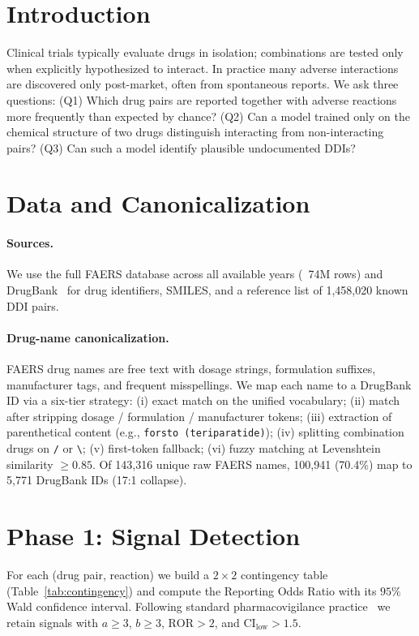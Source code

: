 \documentclass{article}
\begin{document}
\section{Introduction}\label{sec:intro}
Clinical trials typically evaluate drugs in isolation; combinations are tested only when explicitly hypothesized to interact. In practice many adverse interactions are discovered only post-market, often from spontaneous reports. We ask three questions: (Q1) Which drug pairs are reported together with adverse reactions more frequently than expected by chance? (Q2) Can a model trained only on the chemical structure of two drugs distinguish interacting from non-interacting pairs? (Q3) Can such a model identify plausible undocumented DDIs?

\section{Data and Canonicalization}\label{sec:data}

\paragraph{Sources.} We use the full FAERS database across all available years (~74M rows) and DrugBank~\cite{wishart2018drugbank} for drug identifiers, SMILES, and a reference list of 1{,}458{,}020 known DDI pairs.

\paragraph{Drug-name canonicalization.} FAERS drug names are free text with dosage strings, formulation suffixes, manufacturer tags, and frequent misspellings. We map each name to a DrugBank ID via a six-tier strategy: (i) exact match on the unified vocabulary; (ii) match after stripping dosage / formulation / manufacturer tokens; (iii) extraction of parenthetical content (e.g., \texttt{forsto (teriparatide)}); (iv) splitting combination drugs on \texttt{/} or \texttt{\textbackslash}; (v) first-token fallback; (vi) fuzzy matching at Levenshtein similarity $\geq 0.85$. Of 143,316 unique raw FAERS names, 100,941 (70.4\%) map to 5,771 DrugBank IDs (17:1 collapse).

\section{Phase 1: Signal Detection}\label{sec:phase1}

For each (drug pair, reaction) we build a $2\!\times\!2$ contingency table (Table~\ref{tab:contingency}) and compute the Reporting Odds Ratio with its $95\%$ Wald confidence interval. Following standard pharmacovigilance practice~\cite{vanpuijenbroek2002ror} we retain signals with $a\geq 3$, $b\geq 3$, $\mathrm{ROR}>2$, and $\mathrm{CI}_{\text{low}}>1.5$.
\end{document}
